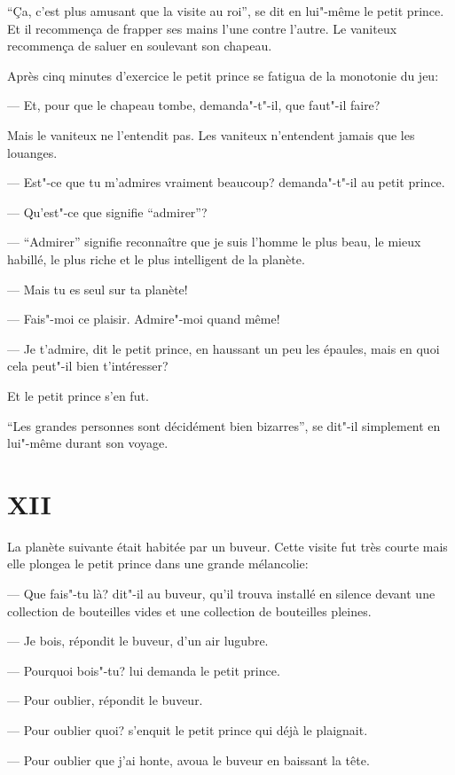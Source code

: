 \begin{Parallel}[p]{}{}
{``Ça, c'est plus amusant que la visite au roi'', se
dit en lui"-même le petit prince. Et il recommença de frapper ses mains l'une contre l'autre.
Le vaniteux recommença de saluer en soulevant son chapeau.

Après cinq minutes d'exercice le petit prince
se fatigua de la monotonie du jeu:

--- Et, pour que le chapeau tombe, demanda"-t"-il,
que faut"-il faire?

Mais le vaniteux ne l'entendit pas. Les vaniteux
n'entendent jamais que les louanges.

--- Est"-ce que tu m'admires vraiment beaucoup?
demanda"-t"-il au petit prince.

--- Qu'est"-ce que signifie ``admirer''?

--- ``Admirer'' signifie reconnaître que je suis
l'homme le plus beau, le mieux habillé, le plus riche
et le plus intelligent de la planète.

--- Mais tu es seul sur ta planète!

--- Fais"-moi ce plaisir. Admire"-moi quand même!

--- Je t'admire, dit le petit prince, en haussant un
peu les épaules, mais en quoi cela peut"-il bien t'intéresser?

Et le petit prince s'en fut.

``Les grandes personnes sont décidément bien
bizarres'', se dit"-il simplement en lui"-même durant
son voyage.

\section{XII}

La planète suivante était habitée par un buveur.
Cette visite fut très courte mais elle plongea le petit
prince dans une grande mélancolie:

--- Que fais"-tu là? dit"-il au buveur, qu'il trouva installé en silence devant une collection de bouteilles
vides et une collection de bouteilles pleines.

--- Je bois, répondit le buveur, d'un air lugubre.

--- Pourquoi bois"-tu? lui demanda le petit prince.

--- Pour oublier, répondit le buveur.

--- Pour oublier quoi? s'enquit le petit prince qui
déjà le plaignait.

--- Pour oublier que j'ai honte, avoua le buveur en baissant la tête.

}
\end{Parallel}
